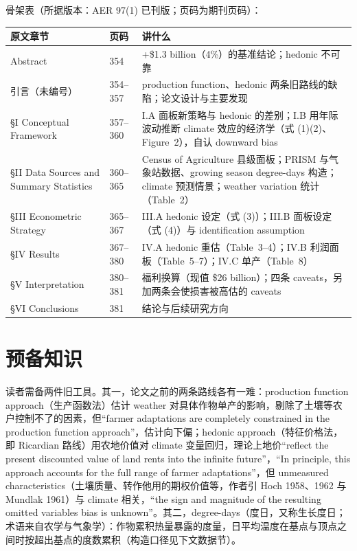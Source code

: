 骨架表（所据版本：AER 97(1) 已刊版；页码为期刊页码）：

\begin{table}[htbp]
\centering\small
\begin{tabular}{@{}p{3.4cm}p{1.6cm}p{7.8cm}@{}}
\toprule
原文章节 & 页码 & 讲什么 \\
\midrule
Abstract & 354 & +\$1.3 billion（4\%）的基准结论；hedonic 不可靠 \\
引言（未编号） & 354--357 & production function、hedonic 两条旧路线的缺陷；论文设计与主要发现 \\
\S I Conceptual Framework & 357--360 & I.A 面板新策略与 hedonic 的差别；I.B 用年际波动推断 climate 效应的经济学（式 (1)(2)、Figure~2），自认 downward bias \\
\S II Data Sources and Summary Statistics & 360--365 & Census of Agriculture 县级面板；PRISM 与气象站数据、growing season degree-days 构造；climate 预测情景；weather variation 统计（Table~2） \\
\S III Econometric Strategy & 365--367 & III.A hedonic 设定（式 (3)）；III.B 面板设定（式 (4)）与 identification assumption \\
\S IV Results & 367--380 & IV.A hedonic 重估（Table~3--4）；IV.B 利润面板（Table~5--7）；IV.C 单产（Table~8） \\
\S V Interpretation & 380--381 & 福利换算（现值 \$26 billion）；四条 caveats，另加两条会使损害被高估的 caveats \\
\S VI Conclusions & 381 & 结论与后续研究方向 \\
\bottomrule
\end{tabular}
\end{table}

\section{预备知识}

读者需备两件旧工具。其一，论文之前的两条路线各有一难：production function approach（生产函数法）估计 weather 对具体作物单产的影响，剔除了土壤等农户控制不了的因素，但``farmer adaptations are completely constrained in the production function approach''\citep[第~355 页]{deschenes2007economic}，估计向下偏；hedonic approach（特征价格法，即 Ricardian 路线）用农地价值对 climate 变量回归，理论上地价``reflect the present discounted value of land rents into the infinite future''\citep[第~355 页]{deschenes2007economic}，``In principle, this approach accounts for the full range of farmer adaptations''\citep[第~355 页]{deschenes2007economic}，但 unmeasured characteristics（土壤质量、转作他用的期权价值等，作者引 Hoch 1958、1962 与 Mundlak 1961）与 climate 相关，``the sign and magnitude of the resulting omitted variables bias is unknown''\citep[第~355 页]{deschenes2007economic}。其二，degree-days（度日，又称生长度日；术语来自农学与气象学）：作物累积热量暴露的度量，日平均温度在基点与顶点之间时按超出基点的度数累积（构造口径见下文数据节）。

